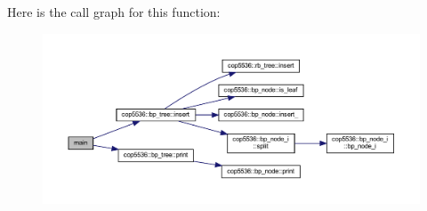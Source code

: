 Here is the call graph for this function\+:
\nopagebreak
\begin{figure}[H]
\begin{center}
\leavevmode
\includegraphics[width=350pt]{bp__main_8cc_a0ddf1224851353fc92bfbff6f499fa97_cgraph}
\end{center}
\end{figure}
